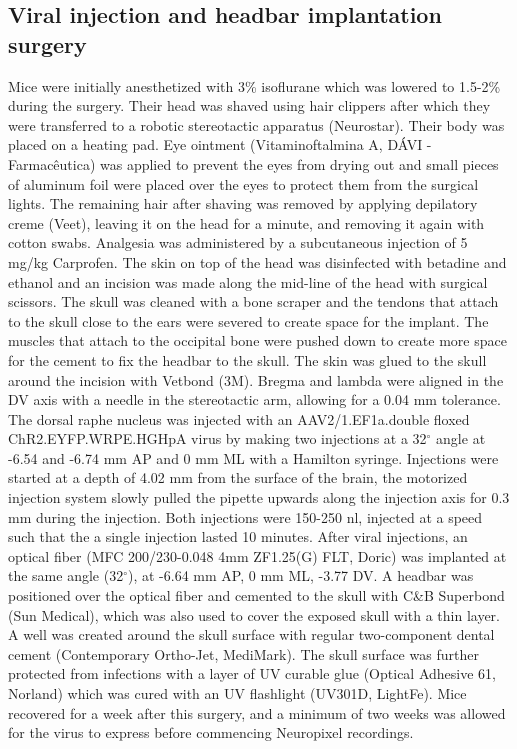 \documentclass[11pt,a4paper,onecolumn]{article}
\begin{document}
\subsection*{Viral injection and headbar implantation surgery}
Mice were initially anesthetized with 3\% isoflurane which was lowered to 1.5-2\% during the surgery. Their head was shaved using hair clippers after which they were transferred to a robotic stereotactic apparatus (Neurostar). Their body was placed on a heating pad. Eye ointment (Vitaminoftalmina A, DÁVI - Farmacêutica) was applied to prevent the eyes from drying out and small pieces of aluminum foil were placed over the eyes to protect them from the surgical lights. The remaining hair after shaving was removed by applying depilatory creme (Veet), leaving it on the head for a minute, and removing it again with cotton swabs. Analgesia was administered by a subcutaneous injection of 5 mg/kg Carprofen. The skin on top of the head was disinfected with betadine and ethanol and an incision was made along the mid-line of the head with surgical scissors. The skull was cleaned with a bone scraper and the tendons that attach to the skull close to the ears were severed to create space for the implant. The muscles that attach to the occipital bone were pushed down to create more space for the cement to fix the headbar to the skull. The skin was glued to the skull around the incision with Vetbond (3M). Bregma and lambda were aligned in the DV axis with a needle in the stereotactic arm, allowing for a 0.04 mm tolerance. The dorsal raphe nucleus was injected with an AAV2/1.EF1a.double floxed ChR2.EYFP.WRPE.HGHpA virus by making two injections at a 32$^\circ$ angle at -6.54 and -6.74 mm AP and 0 mm ML with a Hamilton syringe. Injections were started at a depth of 4.02 mm from the surface of the brain, the motorized injection system slowly pulled the pipette upwards along the injection axis for 0.3 mm during the injection. Both injections were 150-250 nl, injected at a speed such that the a single injection lasted 10 minutes. After viral injections, an optical fiber (MFC 200/230-0.048 4mm ZF1.25(G) FLT, Doric) was implanted at the same angle (32$^\circ$), at -6.64 mm AP, 0 mm ML, -3.77 DV. A headbar was positioned over the optical fiber and cemented to the skull with C\&B Superbond (Sun Medical), which was also used to cover the exposed skull with a thin layer. A well was created around the skull surface with regular two-component dental cement (Contemporary Ortho-Jet, MediMark). The skull surface was further protected from infections with a layer of UV curable glue (Optical Adhesive 61, Norland) which was cured with an UV flashlight (UV301D, LightFe). Mice recovered for a week after this surgery, and a minimum of two weeks was allowed for the virus to express before commencing Neuropixel recordings.
\end{document}
